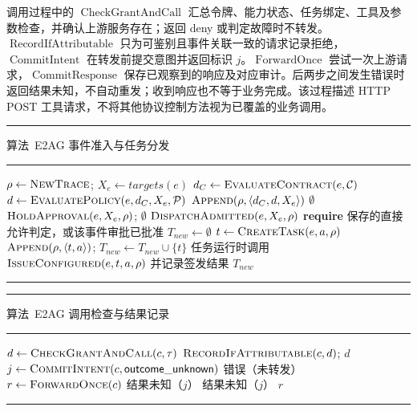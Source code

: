 调用过程中的 $\operatorname{CheckGrantAndCall}$ 汇总令牌、能力状态、任务绑定、工具及参数检查，并确认上游服务存在；返回 deny 或判定故障时不转发。$\operatorname{RecordIfAttributable}$ 只为可鉴别且事件关联一致的请求记录拒绝，$\operatorname{CommitIntent}$ 在转发前提交意图并返回标识 $j$。$\operatorname{ForwardOnce}$ 尝试一次上游请求，$\operatorname{CommitResponse}$ 保存已观察到的响应及对应审计。后两步之间发生错误时返回结果未知，不自动重发；收到响应也不等于业务完成。该过程描述 HTTP POST 工具请求，不将其他协议控制方法视为已覆盖的业务调用。

\par\addvspace{\intextsep}
\noindent\rule{\linewidth}{0.6pt}
\label{alg:e2ag-v11}
{\centering 算法~\thealgorithm\quad E2AG 事件准入与任务分发\par}
\vspace{-0.5\baselineskip}
\noindent\rule{\linewidth}{0.4pt}
\begin{algorithmic}[1]
  \State $\rho\gets\Call{NewTrace}{}$; $X_e\gets targets(e)$
  \State $d_C\gets\Call{EvaluateContract}{e,\mathcal C}$
  \State $d\gets\Call{EvaluatePolicy}{e,d_C,X_e,\mathcal P}$
  \State $\Call{Append}{\rho,\langle d_C,d,X_e\rangle}$
   \State \Return $\emptyset$ \EndIf
    \State $\Call{HoldApproval}{e,X_e,\rho}$; \Return $\emptyset$
  \EndIf
  \State \Return $\Call{DispatchAdmitted}{e,X_e,\rho}$
\EndProcedure
{}
  \State \textbf{require} 保存的直接允许判定，或该事件审批已批准
  \State $T_{new}\gets\emptyset$
    \State $t\gets\Call{CreateTask}{e,a,\rho}$
    \State $\Call{Append}{\rho,\langle t,a\rangle}$; $T_{new}\gets T_{new}\cup\{t\}$
    \State 任务运行时调用 $\Call{IssueConfigured}{e,t,a,\rho}$ 并记录签发结果
  \EndFor
  \State \Return $T_{new}$
\EndProcedure
\end{algorithmic}
\noindent\rule{\linewidth}{0.6pt}
\par\addvspace{\intextsep}

\noindent\begin{minipage}{\linewidth}
\noindent\rule{\linewidth}{0.6pt}
\label{alg:e2ag-call-rr022}
{\centering 算法~\thealgorithm\quad E2AG 调用检查与结果记录\par}
\vspace{-0.5\baselineskip}
\noindent\rule{\linewidth}{0.4pt}
\begin{algorithmic}[1]
  \State $d\gets\Call{CheckGrantAndCall}{c,\tau}$
    \State $\Call{RecordIfAttributable}{c,d}$; \Return $d$
  \EndIf
  \State $j\gets\Call{CommitIntent}{c,\mathsf{outcome\_unknown}}$
   \State \Return 错误（未转发） \EndIf
  \State $r\gets\Call{ForwardOnce}{c}$
   \State \Return 结果未知（$j$） \EndIf
    \State \Return 结果未知（$j$）
  \EndIf
  \State \Return $r$
\EndProcedure
\end{algorithmic}
\noindent\rule{\linewidth}{0.6pt}
\end{minipage}
\par\addvspace{\intextsep}

